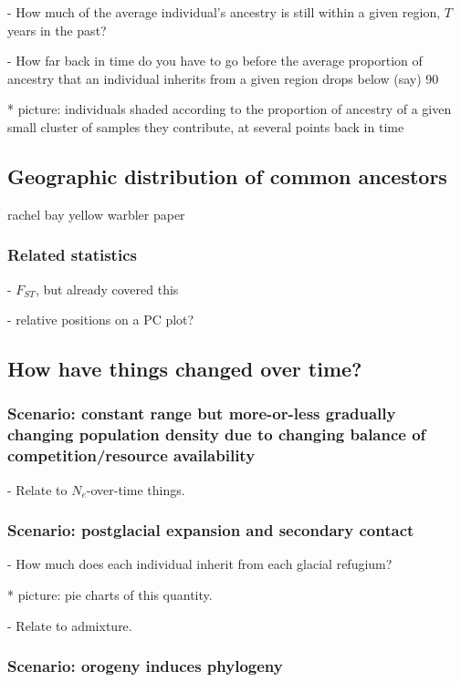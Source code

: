 \documentclass{ar-1col}
\begin{document}
        - How much of the average individual's ancestry is still within a given region, $T$ years in the past?

        - How far back in time do you have to go before the average proportion of ancestry that an individual inherits
            from a given region drops below (say) 90%
           
            * picture: individuals shaded according to the proportion of ancestry of a given small cluster of samples
                they contribute, at several points back in time
               
\subsection{Geographic distribution of common ancestors}
    rachel bay yellow warbler paper

\subsubsection{Related statistics}

        - $F_{ST}$, but already covered this

        - relative positions on a PC plot?

\subsection{How have things changed over time?}
\subsubsection{Scenario: constant range but more-or-less gradually changing population density due to changing balance of competition/resource availability}

        - Relate to $N_e$-over-time things.

\subsubsection{Scenario: postglacial expansion and secondary contact}

        - How much does each individual inherit from each glacial refugium?

            * picture: pie charts of this quantity.

        - Relate to admixture.

\subsubsection{Scenario: orogeny induces phylogeny}
\end{document}
